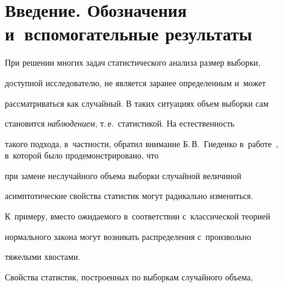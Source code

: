 




 \vspace*{-5pt}



















      \thispagestyle{headings}








\section{Введение. Обозначения и~вспомогательные результаты}





\vspace*{-2pt}





При решении многих задач статистического анализа размер выборки,


доступной исследователю, не является заранее определенным и~может


рассматриваться как случайный. В таких ситуациях объем выборки сам


становится {\it наблюдением}, т.\,е.\ статистикой. На естественность


такого подхода, в~частности, обратил внимание Б.\,В.~Гнеденко в~работе~\cite{Gnedenko1989}, в~которой было продемонстрировано, что


при замене неслучайного объема выборки случайной величиной


асимптотические свойства статистик могут радикально измениться.


К~примеру, вместо ожида\-емо\-го в~соответствии с~классической теорией


нормального закона могут возникать распределения с~произвольно


тяжелыми хвостами.





Свойства статистик, построенных по выборкам случайного объема,


